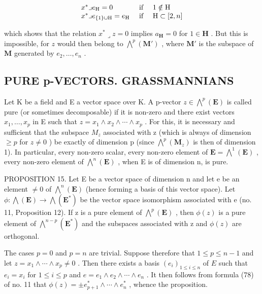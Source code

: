 \[
\begin{array}{l l} x ^ {*} \lrcorner e _ {\mathrm{H}} = 0 & \text { if } \quad 1 \notin \mathrm{H} \\ x ^ {*} \lrcorner e _ {\{1 \} \cup \mathrm{H}} = e _ {\mathrm{H}} & \text { if } \quad \mathrm{H} \subset [ 2, n ] \end{array}
\]

which shows that the relation \(x^{*} \lrcorner z = 0\) implies \(a_{\mathbf{H}} = 0\) for \(1 \in \mathbf{H}\) . But this is impossible, for \(z\) would then belong to \(\bigwedge^{p}(\mathbf{M}')\) , where \(\mathbf{M}'\) is the subspace of \(\mathbf{M}\) generated by \(e_2, \ldots, e_n\) .

\subsection{PURE p-VECTORS. GRASSMANNIANS}

Let K be a field and E a vector space over K. A p-vector \(z \in \bigwedge^{p}(\mathbf{E})\) is called pure (or sometimes decomposable) if it is non-zero and there exist vectors \(x_{1}, \ldots, x_{p}\) in E such that \(z = x_{1} \wedge x_{2} \wedge \cdots \wedge x_{p}\) . For this, it is necessary and sufficient that the subspace \(M_{z}\) associated with z (which is always of dimension \(\geqslant p\) for \(z \neq 0\) ) be exactly of dimension p (since \(\bigwedge^{p}(\mathbf{M}_{z})\) is then of dimension 1). In particular, every non-zero scalar, every non-zero element of \(\mathbf{E} = \bigwedge^{1}(\mathbf{E})\) , every non-zero element of \(\bigwedge^{n}(\mathbf{E})\) , when E is of dimension n, is pure.

PROPOSITION 15. Let E be a vector space of dimension n and let e be an element \(\neq0\) of \(\bigwedge^{n}(\mathbf{E})\) (hence forming a basis of this vector space). Let \(\phi:\bigwedge(\mathbf{E})\to\bigwedge(\mathbf{E}^{*})\) be the vector space isomorphism associated with e (no. 11, Proposition 12). If z is a pure element of \(\bigwedge^{p}(\mathbf{E})\) , then \(\phi(z)\) is a pure element of \(\bigwedge^{n-p}(\mathbf{E}^{*})\) and the subspaces associated with z and \(\phi(z)\) are orthogonal.

The cases \(p = 0\) and \(p = n\) are trivial. Suppose therefore that \(1 \leqslant p \leqslant n - 1\) and let \(z = x_1 \wedge \cdots \wedge x_p \neq 0\) . Then there exists a basis \((e_i)_{1 \leqslant i \leqslant n}\) of \(E\) such that \(e_i = x_i\) for \(1 \leqslant i \leqslant p\) and \(e = e_1 \wedge e_2 \wedge \cdots \wedge e_n\) . It then follows from formula (78) of no. 11 that \(\phi(z) = \pm e_{p+1}^* \wedge \cdots \wedge e_n^*\) , whence the proposition.

